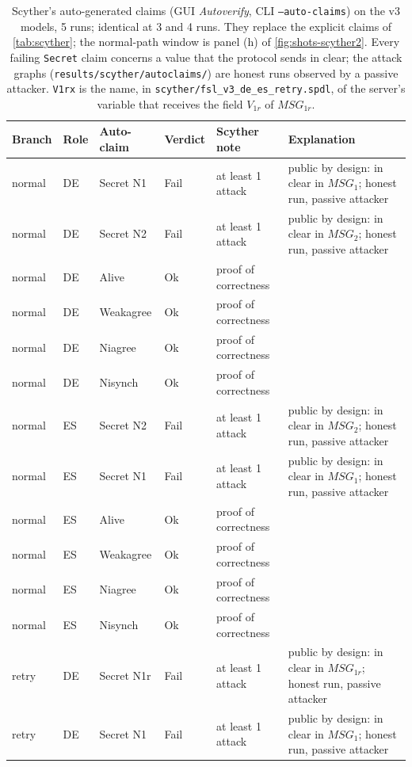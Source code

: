 \begin{table}[!t]
\centering
\footnotesize
\caption{Scyther's auto-generated claims (GUI \emph{Autoverify}, CLI \texttt{--auto-claims}) on the v3 models, 5 runs; identical at 3 and 4 runs. They replace the explicit claims of \cref{tab:scyther}; the normal-path window is panel (h) of \cref{fig:shots-scyther2}. Every failing \texttt{Secret} claim concerns a value that the protocol sends in clear; the attack graphs (\texttt{results/scyther/autoclaims/}) are honest runs observed by a passive attacker. \texttt{V1rx} is the name, in \texttt{scyther/fsl\_v3\_de\_es\_retry.spdl}, of the server's variable that receives the field $V_{1r}$ of $MSG_{1r}$.}
\label{tab:scyther-auto}
\setlength{\tabcolsep}{3pt}
\begin{tabular}{llp{2.6cm}lp{2.6cm}p{5.6cm}}
\toprule
Branch & Role & Auto-claim & Verdict & Scyther note & Explanation \\
\midrule
normal & DE & Secret N1 & Fail & at least 1 attack & public by design: in clear in $MSG_1$; honest run, passive attacker \\
normal & DE & Secret N2 & Fail & at least 1 attack & public by design: in clear in $MSG_2$; honest run, passive attacker \\
normal & DE & Alive & Ok & proof of correctness &  \\
normal & DE & Weakagree & Ok & proof of correctness &  \\
normal & DE & Niagree & Ok & proof of correctness &  \\
normal & DE & Nisynch & Ok & proof of correctness &  \\
normal & ES & Secret N2 & Fail & at least 1 attack & public by design: in clear in $MSG_2$; honest run, passive attacker \\
normal & ES & Secret N1 & Fail & at least 1 attack & public by design: in clear in $MSG_1$; honest run, passive attacker \\
normal & ES & Alive & Ok & proof of correctness &  \\
normal & ES & Weakagree & Ok & proof of correctness &  \\
normal & ES & Niagree & Ok & proof of correctness &  \\
normal & ES & Nisynch & Ok & proof of correctness &  \\
retry & DE & Secret N1r & Fail & at least 1 attack & public by design: in clear in $MSG_{1r}$; honest run, passive attacker \\
retry & DE & Secret N1 & Fail & at least 1 attack & public by design: in clear in $MSG_1$; honest run, passive attacker \\

\end{tabular}
\end{table}
